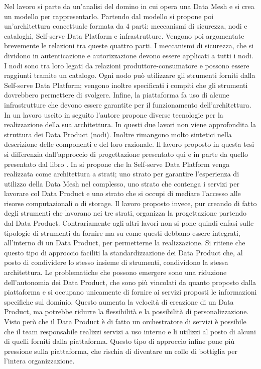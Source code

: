 \documentclass[12pt]{report}
\begin{document}
Nel lavoro si parte da un'analisi del domino in cui opera una Data Mesh e si crea un modello per rappresentarlo.
Partendo dal modello si propone poi un'architettura concettuale formata da 4 parti: meccanismi di sicurezza, nodi e cataloghi, Self-serve Data Platform e infrastrutture.
Vengono poi argomentate brevemente le relazioni tra queste quattro parti. 
I meccanismi di sicurezza, che si dividono in autenticazione e autorizzazione devono essere applicati a tutti i nodi. 
I nodi sono tra loro legati da relazioni produttore-consumatore e possono essere raggiunti tramite un catalogo. 
Ogni nodo può utilizzare gli strumenti forniti dalla Self-serve Data Platform; vengono inoltre specificati i compiti che gli strumenti dovrebbero permettere di svolgere.
Infine, la piattaforma fa uso di alcune infrastrutture che devono essere garantite per il funzionamento dell'architettura.
In un lavoro uscito in seguito \cite{araujo2022advancing} l'autore propone diverse tecnologie per la realizzazione della sua architettura.
In questi due lavori non viene approfondita la struttura dei Data Product (nodi). 
Inoltre rimangono molto sintetici nella descrizione delle componenti e del loro razionale.
Il lavoro proposto in questa tesi si differenzia dall'approccio di progettazione presentato qui e in parte da quello presentato dal libro \cite{dehghani_data_2022}.
In \cite{dehghani_data_2022} si propone che la Self-serve Data Platform venga realizzata come architettura a strati; uno strato per garantire l'esperienza di utilizzo della Data Mesh nel complesso, uno strato che contenga i servizi per lavorare col Data Product e uno strato che si occupi di mediare l'accesso alle risorse computazionali o di storage.
Il lavoro proposto invece, pur creando di fatto degli strumenti che lavorano nei tre strati, organizza la progettazione partendo dal Data Product. 
Contrariamente agli altri lavori non si pone quindi enfasi sulle tipologie di strumenti da fornire ma su come questi debbano essere integrati, all'interno di un Data Product, per permetterne la realizzazione.
Si ritiene che questo tipo di approccio faciliti la standardizzazione dei Data Product che, al posto di condividere lo stesso insieme di strumenti, condividono la stessa architettura.
Le problematiche che possono emergere sono una riduzione dell'autonomia dei Data Product, che sono più vincolati da quanto proposto dalla piattaforma e si occupano unicamente di fornire ai servizi proposti le informazioni specifiche sul dominio. 
Questo aumenta la velocità di creazione di un Data Product, ma potrebbe ridurre la flessibilità e la possibilità di personalizzazione.
Visto però che il Data Product è di fatto un orchestratore di servizi è possibile che il team responsabile realizzi servizi a uso interno e li utilizzi al posto di alcuni di quelli forniti dalla piattaforma.
Questo tipo di approccio infine pone più pressione sulla piattaforma, che rischia di diventare un collo di bottiglia per l'intera organizzazione.
\end{document}
